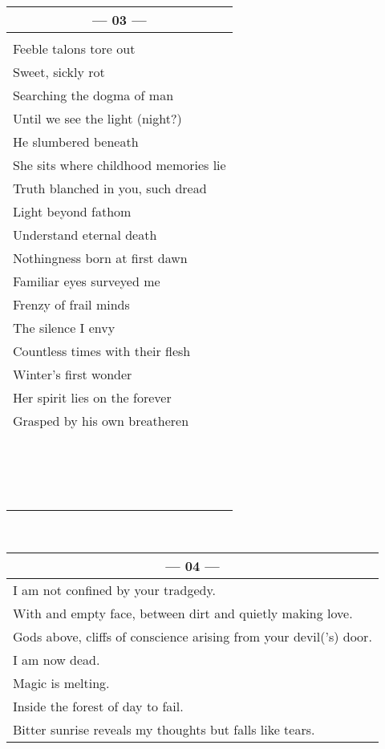 \documentclass{article}
\begin{document}
\begin{center}
\begin{tabular}{l}
\multicolumn{1}{c}{\textbf{--- 03 ---}} \\ \hline
\\
Feeble talons tore out \\
Sweet, sickly rot \\
Searching the dogma of man \\
Until we see the light (night?) \\
He slumbered beneath \\
She sits where childhood memories lie \\
Truth blanched in you, such dread \\
Light beyond fathom \\
Understand eternal death \\
Nothingness born at first dawn \\
Familiar eyes surveyed me \\
Frenzy of frail minds \\
The silence I envy \\
Countless times with their flesh \\
Winter's first wonder \\
Her spirit lies on the forever \\
Grasped by his own breatheren \\
\\
\\
\\
\\
\\
\\
\\
\\
\\
\\
\\
\\
\\
\\
\\
\\
\end{tabular} \\
\begin{tabular}{l}
\multicolumn{1}{c}{\textbf{--- 04 ---}} \\ \hline
I am not confined by your tradgedy. \\
With and empty face, between dirt and quietly making love. \\
Gods above, cliffs of conscience arising from your devil('s) door. \\
I am now dead. \\
Magic is melting. \\
Inside the forest of day to fail. \\ %
Bitter sunrise reveals my thoughts but falls like tears. \\
\end{tabular}
\end{center}
\end{document}
